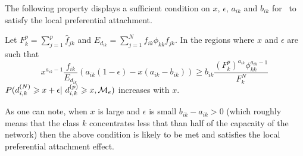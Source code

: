 The following property displays a sufficient condition on $x$, $\epsilon$, $a_{ik}$ and $b_{ik}$ for \imb\ to satisfy the local preferential attachment.

\begin{proposition}\label{prop:IMBlocal}
Let $F_k^p = \sum_{j=1}^p \hat{f}_{jk}$ and $E_{d_{ik}}=\sum_{j=1}^N f_{ik}\phi_{kk}f_{jk}$. In the regions where $x$ and $\epsilon$ are such that
\begin{equation*}
x^{a_{ik}-1}\frac{f_{ik}}{E_{d_{ik}}}\left(a_{ik}(1-\epsilon) -x(a_{ik}-b_{ik}) \right) \geq b_{ik}\frac{(F_k^p)^{a_{ik}}\phi_{kk}^{a_{ik}-1}}{F_k^N}
\end{equation*}
$P(d_{i,k}^{(N)} \geq x+\epsilon | d_{i,k}^{(p)} \geq x,\M_e)$ increases with $x$.
\end{proposition}

As one can note, when $x$ is large and $\epsilon$ is small $b_{ik}-a_{ik}>0$ (which roughly means that the class $k$ concentrates less that than half of the capacaity of the network) then the above condition is likely to be met and \imb satisfies the local preferential attachment effect. 

